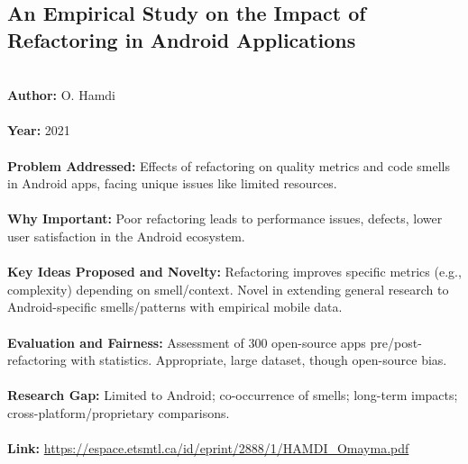 \documentclass[12pt]{article}
\begin{document}
\subsection*{An Empirical Study on the Impact of Refactoring in Android Applications}
\\
\textbf{Author:} O. Hamdi \\
\\
\textbf{Year:} 2021 \\
\\
\textbf{Problem Addressed:} Effects of refactoring on quality metrics and code smells in Android apps, facing unique issues like limited resources. \\
\\
\textbf{Why Important:} Poor refactoring leads to performance issues, defects, lower user satisfaction in the Android ecosystem. \\
\\
\textbf{Key Ideas Proposed and Novelty:} Refactoring improves specific metrics (e.g., complexity) depending on smell/context. Novel in extending general research to Android-specific smells/patterns with empirical mobile data. \\
\\
\textbf{Evaluation and Fairness:} Assessment of 300 open-source apps pre/post-refactoring with statistics. Appropriate, large dataset, though open-source bias. \\
\\
\textbf{Research Gap:} Limited to Android; co-occurrence of smells; long-term impacts; cross-platform/proprietary comparisons. \\
\\
\textbf{Link:} \url{https://espace.etsmtl.ca/id/eprint/2888/1/HAMDI_Omayma.pdf}
\pagebreak

\end{document}
